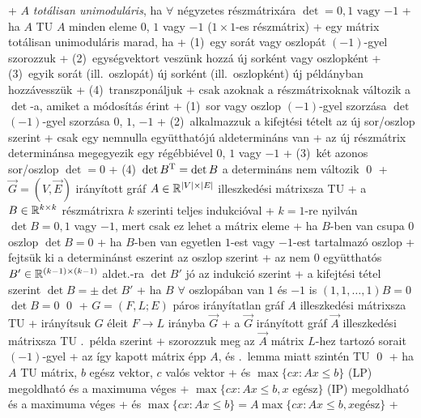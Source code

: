 + \dfn $A$ \emph{totálisan unimoduláris}, ha $\forall$ négyzetes
  részmátrixára $\det = 0, 1 \text{ vagy } {-1}$
  + \corr ha $A$ TU \RA $A$ minden eleme $0$, $1$ vagy $-1$ ($1 \times
    1$-es részmátrix)
+ \lemma \label{lem:linprog:ip:tu}egy mátrix totálisan unimoduláris marad, ha
  + (1)~egy sorát vagy oszlopát $(-1)$-gyel szorozzuk
  + (2)~egységvektort veszünk hozzá új sorként vagy oszlopként
  + (3)~egyik sorát (ill.~oszlopát) új sorként (ill.~oszlopként) új
    példányban hozzávesszük
  + (4)~transzponáljuk
  + \proof csak azoknak a részmátrixoknak változik a $\det$-a,
    amiket a módosítás érint
    + (1)~sor vagy oszlop $(-1)$-gyel szorzása \RA $\det$ $(-1)$-gyel
      szorzása \RA $0$, $1$, $-1$
    + (2)~alkalmazzuk a kifejtési tételt az új sor/oszlop szerint
      + csak egy nemnulla együtthatójú aldetermináns van
      + az új részmátrix determinánsa megegyezik egy régébbiével \RA%
        $0$, $1$ vagy $-1$
    + (3)~két azonos sor/oszlop \RA $\det = 0$
    + (4)~$\det B^{\mathrm{T}} = \det B$ \RA a determináns nem változik \qed
+ \example \label{ex:linprog:ip:directed}$\vec{G} = (V, \vec{E})$ irányított gráf $A \in \mathbb{R}^{\lvert
  V \rvert \times \lvert E \rvert}$ illeszkedési
  mátrixsza TU
  + \proof a $B \in \mathbb{R}^{k \times k}$ részmátrixra $k$ szerinti teljes
    indukcióval
    + $k = 1$-re nyilván $\det B = 0, 1$ vagy $-1$, mert csak ez lehet
      a mátrix eleme
    + ha $B$-ben van csupa $0$ oszlop \RA $\det B = 0$
    + ha $B$-ben van egyetlen $1$-est vagy $-1$-est tartalmazó oszlop
      + fejtsük ki a determinánst eszerint az oszlop szerint
      + az nem $0$ együtthatós $B' \in \mathbb{R}^{(k - 1) \times (k
        - 1)}$ aldet.-ra $\det B'$ jó az indukció  szerint
      + a kifejtési tétel szerint $\det B = \pm \det B'$
    + ha $B$ $\forall$ oszlopában van $1$ és $-1$ is \RA $(1, 1,
      \ldots, 1) B = 0$ \RA $\det B = 0$ \qed
+ \example $G = (F, L; E)$ páros irányítatlan gráf $A$ illeszkedési
  mátrixsza TU
  + \proof irányítsuk $G$ éleit $F \to L$ irányba \RA $\vec{G}$
    + a $\vec{G}$ irányított gráf $\vec{A}$ illeszkedési mátrixsza TU
      .~példa szerint
    + szorozzuk meg az $\vec{A}$ mátrix $L$-hez tartozó sorait $(-1)$-gyel
    + az így kapott mátrix épp $A$, és .~lemma
      miatt szintén TU \qed
+ \thm ha $A$ TU mátrix, $b$ egész vektor, $c$ valós vektor
  + és $\max \{ cx : Ax \le b \}$ (LP) megoldható és a maximuma véges
  + \RA $\max \{ cx : Ax \le b, x \text{ egész} \}$ (IP) megoldható és
    a maximuma véges
  + és $\max \{ cx : Ax \le b \} = A \max \{ cx : Ax \le b, x \text{
    egész} \}$
  + \noproof

